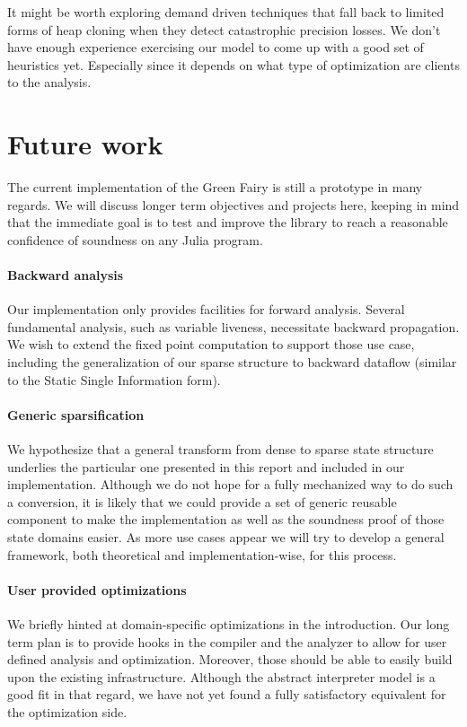 \documentclass[11pt]{article}
\begin{document}
It might be worth exploring demand driven techniques that fall back to limited forms of heap cloning when they detect catastrophic precision losses.
We don't have enough experience exercising our model to come up with a good set of heuristics yet.
Especially since it depends on what type of optimization are clients to the analysis.

\clearpage

\section*{Future work}

The current implementation of the Green Fairy is still a prototype in many regards.
We will discuss longer term objectives and projects here, keeping in mind that the immediate goal is to test and improve the library to reach a reasonable confidence of soundness on any Julia program.

\paragraph{Backward analysis}
Our implementation only provides facilities for forward analysis.
Several fundamental analysis, such as variable liveness, necessitate backward propagation.
We wish to extend the fixed point computation to support those use case, including the generalization of our sparse structure to backward dataflow (similar to the Static Single Information form).

\paragraph{Generic sparsification} We hypothesize that a general transform from dense to sparse state structure underlies the particular one presented in this report and included in our implementation.
Although we do not hope for a fully mechanized way to do such a conversion, it is likely that we could provide a set of generic reusable component to make the implementation as well as the soundness proof of those state domains easier.
As more use cases appear we will try to develop a general framework, both theoretical and implementation-wise, for this process.

\paragraph{User provided optimizations} We briefly hinted at domain-specific optimizations in the introduction.
Our long term plan is to provide hooks in the compiler and the analyzer to allow for user defined analysis and optimization.
Moreover, those should be able to easily build upon the existing infrastructure.
Although the abstract interpreter model is a good fit in that regard, we have not yet found a fully satisfactory equivalent for the optimization side.
\end{document}
